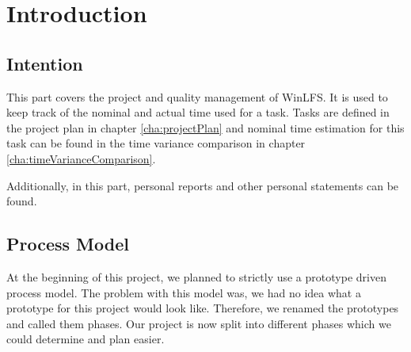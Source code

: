 \chapter{Introduction}
\label{cha:introduction}

\section{Intention}
This part covers the project and quality management of WinLFS. It is used to keep track of the nominal and actual time used for a task. Tasks are defined in the project plan in chapter \ref{cha:projectPlan} and nominal time estimation for this task can be found in the time variance comparison in chapter \ref{cha:timeVarianceComparison}.

Additionally, in this part, personal reports and other personal statements can be found.

\section{Process Model}
At the beginning of this project, we planned to strictly use a prototype driven process model. The problem with this model was, we had no idea what a prototype for this project would look like. Therefore, we renamed the prototypes and called them phases. Our project is now split into different phases which we could determine and plan easier.